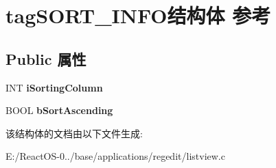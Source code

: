 \hypertarget{structtag_s_o_r_t___i_n_f_o}{}\section{tag\+S\+O\+R\+T\+\_\+\+I\+N\+F\+O结构体 参考}
\label{structtag_s_o_r_t___i_n_f_o}
\subsection*{Public 属性}
\begin{DoxyCompactItemize}
\item 
\mbox{\label{structtag_s_o_r_t___i_n_f_o_ac73908c923a9b8cdcfacdb77a371a1dd}} 
I\+NT {\bfseries i\+Sorting\+Column}
\item 
\mbox{\label{structtag_s_o_r_t___i_n_f_o_a73ebfb550773f7fb3e716b0260a4894e}} 
B\+O\+OL {\bfseries b\+Sort\+Ascending}
\end{DoxyCompactItemize}


该结构体的文档由以下文件生成\+:\begin{DoxyCompactItemize}
\item 
E\+:/\+React\+O\+S-\/0../base/applications/regedit/listview.\+c\end{DoxyCompactItemize}
